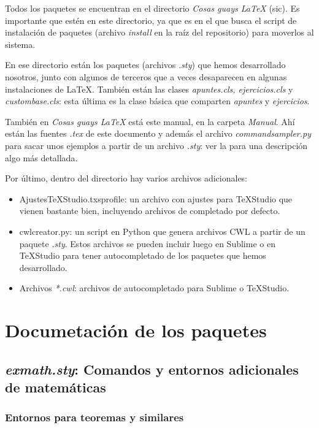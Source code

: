 Todos los paquetes se encuentran en el directorio \textit{Cosas guays LaTeX} (sic). Es importante que estén en este directorio, ya que es en el que busca el script de instalación de paquetes (archivo \textit{install} en la raíz del repositorio) para moverlos al sistema.

En ese directorio están los paquetes (archivos \textit{.sty}) que hemos desarrollado nosotros, junto con algunos de terceros que a veces desaparecen en algunas instalaciones de \LaTeX. También están las clases \textit{apuntes.cls, ejercicios.cls} y \textit{custombase.cls}: esta última es la clase básica que comparten \textit{apuntes} y \textit{ejercicios}.

También en \textit{Cosas guays LaTeX} está este manual, en la carpeta \textit{Manual}. Ahí están las fuentes \textit{.tex} de este documento y además el archivo \textit{commandsampler.py} para sacar unos ejemplos a partir de un archivo \textit{.sty}: ver la  para una descripción algo más detallada.

Por último, dentro del directorio hay varios archivos adicionales:

\begin{itemize}
\item AjustesTeXStudio.txsprofile: un archivo con ajustes para TeXStudio que vienen bastante bien, incluyendo archivos de completado por defecto.
\item {} cwlcreator.py: un script en Python que genera archivos CWL a partir de un paquete \textit{.sty}. Estos archivos se pueden incluir luego en Sublime o en TeXStudio para tener autocompletado de los paquetes que hemos desarrollado.
\item Archivos \textit{*.cwl}: archivos de autocompletado para Sublime o TeXStudio.
\end{itemize}

\section{Documetación de los paquetes}

\subsection{\textit{exmath.sty}: Comandos y entornos adicionales de matemáticas}
\label{sec:Exmath}

\subsubsection{Entornos para teoremas y similares}

